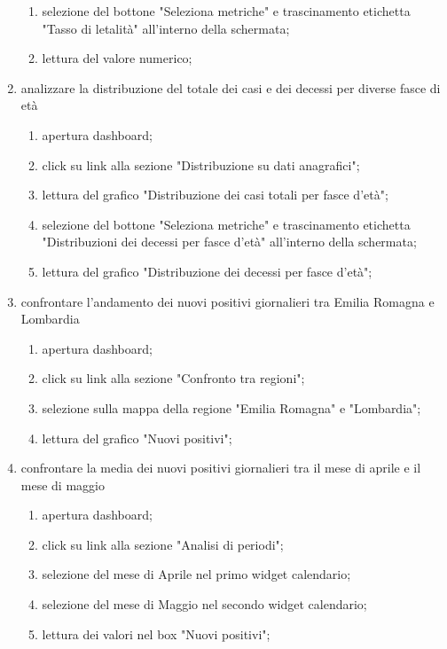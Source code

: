 \begin{enumerate}
\begin{enumerate}
        \item selezione del bottone "Seleziona metriche" e trascinamento etichetta "Tasso di letalità" all'interno della schermata;
        \item lettura del valore numerico;
    \end{enumerate}
    \item analizzare la distribuzione del totale dei casi e dei decessi per diverse fasce di età
    \begin{enumerate}
        \item apertura dashboard;
        \item click su link alla sezione "Distribuzione su dati anagrafici";
        \item lettura del grafico "Distribuzione dei casi totali per fasce d’età";
        \item selezione del bottone "Seleziona metriche" e trascinamento etichetta "Distribuzioni dei decessi per fasce d'età" all'interno della schermata;
        \item lettura del grafico "Distribuzione dei decessi per fasce d’età";
    \end{enumerate}
    \item confrontare l'andamento dei nuovi positivi giornalieri tra Emilia Romagna e Lombardia
    \begin{enumerate}
        \item apertura dashboard;
        \item click su link alla sezione "Confronto tra regioni";
        \item selezione sulla mappa della regione "Emilia Romagna" e "Lombardia";
        \item lettura del grafico "Nuovi positivi";
    \end{enumerate}
    \item confrontare la media dei nuovi positivi giornalieri tra il mese di aprile e il mese di maggio
    \begin{enumerate}
        \item apertura dashboard;
        \item click su link alla sezione "Analisi di periodi";
        \item selezione del mese di Aprile nel primo widget calendario;
        \item selezione del mese di Maggio nel secondo widget calendario;
        \item lettura dei valori nel box "Nuovi positivi";
    \end{enumerate}
\end{enumerate}
